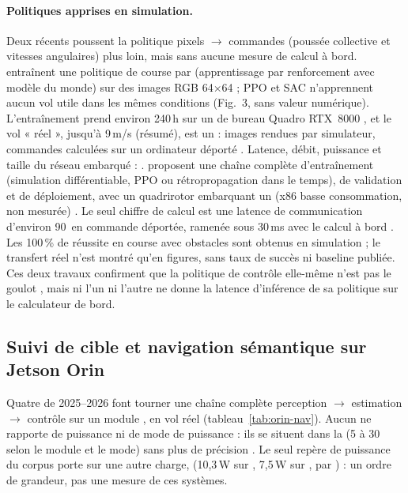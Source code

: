 \paragraph{Politiques apprises en simulation.} Deux  récents poussent la
politique pixels $\rightarrow$ commandes (poussée collective et vitesses angulaires) plus
loin, mais sans aucune mesure de calcul à bord. \citet{arxiv-2501.14377-dream-fly-model-reinforcement-learning}\pp{}
entraînent une politique de course par  (apprentissage par renforcement avec modèle
du monde) sur des images RGB 64$\times$64  ; PPO et SAC n'apprennent aucun vol utile
dans les mêmes conditions (Fig.~3, sans valeur numérique). L'entraînement prend environ
240\,h sur un  de bureau Quadro RTX~8000 , et le vol « réel », jusqu'à 9\,m/s
(résumé), est un  : images rendues par simulateur, commandes
calculées sur un ordinateur déporté . Latence, débit, puissance et taille du
réseau embarqué : \nr. \citet{arxiv-2604.12916-e2e-fly-integrated-training-deployment}\pp{}
proposent une chaîne complète d'entraînement (simulation différentiable, PPO ou rétropropagation
dans le temps), de validation et de déploiement, avec un quadrirotor embarquant un 
(x86 basse consommation,  non mesurée) . Le seul chiffre de calcul est une
latence de communication d'environ 90\, en commande déportée, ramenée sous 30\,ms avec le
calcul à bord . Les 100\,\% de réussite en course avec obstacles sont obtenus en
simulation  ; le transfert réel n'est montré qu'en figures, sans taux de succès
ni baseline publiée. Ces deux travaux confirment que la politique de contrôle elle-même
n'est pas le goulot \deduit, mais ni l'un ni l'autre ne donne la latence d'inférence de sa
politique sur le calculateur de bord.

\subsection{Suivi de cible et navigation sémantique sur Jetson Orin}

Quatre  de 2025--2026 font tourner une chaîne complète perception
$\rightarrow$ estimation $\rightarrow$ contrôle sur un module , en vol réel
(tableau~\ref{tab:orin-nav}). Aucun ne rapporte de puissance ni de mode de puissance :
ils se situent dans la  (5 à 30\, selon le module et le mode) sans plus de
précision \deduit. Le seul repère de puissance  du corpus porte sur une autre charge,
  (10,3\,W sur , 7,5\,W sur , par
) \citep[Table~4]{arxiv-2502.15737-performance-analysis-you-only-look} :
un ordre de grandeur, pas une mesure de ces systèmes.


